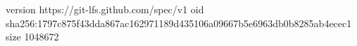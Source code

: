 version https://git-lfs.github.com/spec/v1
oid sha256:1797c875f43dda867ac162971189d435106a09667b5e6963db0b8285ab4ecec1
size 1048672
